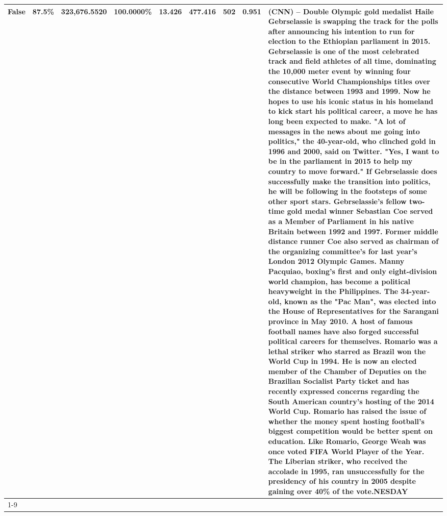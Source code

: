\begin{table}[H]
{\begin{tabular}{lllrlllll}
False & 87.5\% & 323,676.5520 & \bfseries \color{red} 100.0000\% & 13.426 & 477.416 & 502 & 0.951 & (CNN) -- Double Olympic gold medalist Haile Gebrselassie is swapping the track for the polls after announcing his intention to run for election to the Ethiopian parliament in 2015. Gebrselassie is one of the most celebrated track and field athletes of all time, dominating the 10,000 meter event by winning four consecutive World Championships titles over the distance between 1993 and 1999. Now he hopes to use his iconic status in his homeland to kick start his political career, a move he has long been expected to make. "A lot of messages in the news about me going into politics," the 40-year-old, who clinched gold in 1996 and 2000, said on Twitter. "Yes, I want to be in the parliament in 2015 to help my country to move forward." If Gebrselassie does successfully make the transition into politics, he will be following in the footsteps of some other sport stars. Gebrselassie's fellow two-time gold medal winner Sebastian Coe served as a Member of Parliament in his native Britain between 1992 and 1997. Former middle distance runner Coe also served as chairman of the organizing committee's for last year's London 2012 Olympic Games. Manny Pacquiao, boxing's first and only eight-division world champion, has become a political heavyweight in the Philippines. The 34-year-old, known as the "Pac Man", was elected into the House of Representatives for the Sarangani province in May 2010. A host of famous football names have also forged successful political careers for themselves. Romario was a lethal striker who starred as Brazil won the World Cup in 1994. He is now an elected member of the Chamber of Deputies on the Brazilian Socialist Party ticket and has recently expressed concerns regarding the South American country's hosting of the 2014 World Cup. Romario has raised the issue of whether the money spent hosting football's biggest competition would be better spent on education. Like Romario, George Weah was once voted FIFA World Player of the Year. The Liberian striker, who received the accolade in 1995, ran unsuccessfully for the presidency of his country in 2005 despite gaining over 40\% of the vote.NESDAY \\
\cline{1-9}

\end{tabular}}
\end{table}
